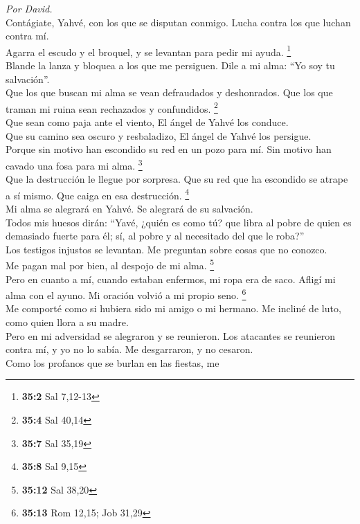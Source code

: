 \emph{Por David.}\\
 Contágiate, Yahvé, con los que se disputan conmigo. Lucha
contra los que luchan contra mí.\\
 Agarra el escudo y el broquel, y se levantan para pedir
mi ayuda. \footnote{\textbf{35:2} Sal 7,12-13}\\
 Blande la lanza y bloquea a los que me persiguen. Dile a
mi alma: ``Yo soy tu salvación''.\\
 Que los que buscan mi alma se vean defraudados y
deshonrados. Que los que traman mi ruina sean rechazados y confundidos.
\footnote{\textbf{35:4} Sal 40,14}\\
 Que sean como paja ante el viento, El ángel de Yahvé los
conduce.\\
 Que su camino sea oscuro y resbaladizo, El ángel de Yahvé
los persigue.\\
 Porque sin motivo han escondido su red en un pozo para
mí. Sin motivo han cavado una fosa para mi alma. \footnote{\textbf{35:7}
  Sal 35,19}\\
 Que la destrucción le llegue por sorpresa. Que su red que
ha escondido se atrape a sí mismo. Que caiga en esa destrucción.
\footnote{\textbf{35:8} Sal 9,15}\\
 Mi alma se alegrará en Yahvé. Se alegrará de su
salvación.\\
 Todos mis huesos dirán: ``Yavé, ¿quién es como tú? que
libra al pobre de quien es demasiado fuerte para él; sí, al pobre y al
necesitado del que le roba?''\\
 Los testigos injustos se levantan. Me preguntan sobre
cosas que no conozco.\\
 Me pagan mal por bien, al despojo de mi alma.
\footnote{\textbf{35:12} Sal 38,20}\\
 Pero en cuanto a mí, cuando estaban enfermos, mi ropa
era de saco. Afligí mi alma con el ayuno. Mi oración volvió a mi propio
seno. \footnote{\textbf{35:13} Rom 12,15; Job 31,29}\\
 Me comporté como si hubiera sido mi amigo o mi hermano.
Me incliné de luto, como quien llora a su madre.\\
 Pero en mi adversidad se alegraron y se reunieron. Los
atacantes se reunieron contra mí, y yo no lo sabía. Me desgarraron, y no
cesaron.\\
 Como los profanos que se burlan en las fiestas, me
